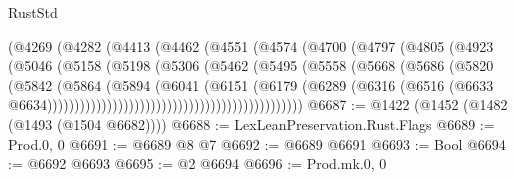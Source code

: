 \begin{lexlean}{RustStd}
\begin{coremodule}
                                      (@4269
                                        (@4282
                                          (@4413
                                            (@4462
                                              (@4551
                                                (@4574
                                                  (@4700
                                                    (@4797
                                                      (@4805
                                                        (@4923
                                                          (@5046
                                                            (@5158
                                                              (@5198
                                                                (@5306
                                                                  (@5462
                                                                    (@5495
                                                                      (@5558
                                                                        (@5668
                                                                          (@5686
                                                                            (@5820
                                                                              (@5842
                                                                                (@5864
                                                                                  (@5894
                                                                                    (@6041
                                                                                      (@6151
                                                                                        (@6179
                                                                                          (@6289
                                                                                            (@6316
                                                                                              (@6516
                                                                                                (@6633
                                                                                                  @6634)))))))))))))))))))))))))))))))))))))))))))))))
@6687 := @1422 (@1452 (@1482 (@1493 (@1504 @6682))))
@6688 := LexLeanPreservation.Rust.Flags
@6689 := Prod.{0, 0}
@6691 := @6689 @8 @7
@6692 := @6689 @6691
@6693 := Bool
@6694 := @6692 @6693
@6695 := @2 @6694
@6696 := Prod.mk.{0, 0}

\end{coremodule}
\end{lexlean}
